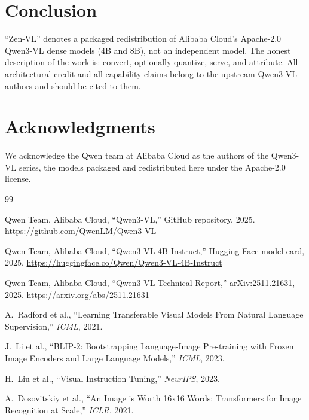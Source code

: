 \documentclass[11pt,a4paper]{article}
\begin{document}
\section{Conclusion}

``Zen-VL'' denotes a packaged redistribution of Alibaba Cloud's Apache-2.0 Qwen3-VL dense
models (4B and 8B), not an independent model. The honest description of the work is:
convert, optionally quantize, serve, and attribute. All architectural credit and all
capability claims belong to the upstream Qwen3-VL authors and should be cited to them.

\section*{Acknowledgments}

We acknowledge the Qwen team at Alibaba Cloud as the authors of the Qwen3-VL series, the
models packaged and redistributed here under the Apache-2.0 license.

\begin{thebibliography}{99}

Qwen Team, Alibaba Cloud,
``Qwen3-VL,'' GitHub repository, 2025.
\url{https://github.com/QwenLM/Qwen3-VL}

Qwen Team, Alibaba Cloud,
``Qwen3-VL-4B-Instruct,'' Hugging Face model card, 2025.
\url{https://huggingface.co/Qwen/Qwen3-VL-4B-Instruct}

Qwen Team, Alibaba Cloud,
``Qwen3-VL Technical Report,'' arXiv:2511.21631, 2025.
\url{https://arxiv.org/abs/2511.21631}

A.~Radford et al., ``Learning Transferable Visual Models From Natural Language Supervision,''
\textit{ICML}, 2021.

J.~Li et al., ``BLIP-2: Bootstrapping Language-Image Pre-training with Frozen Image Encoders
and Large Language Models,'' \textit{ICML}, 2023.

H.~Liu et al., ``Visual Instruction Tuning,'' \textit{NeurIPS}, 2023.

A.~Dosovitskiy et al., ``An Image is Worth 16x16 Words: Transformers for Image Recognition
at Scale,'' \textit{ICLR}, 2021.

\end{thebibliography}
\end{document}
